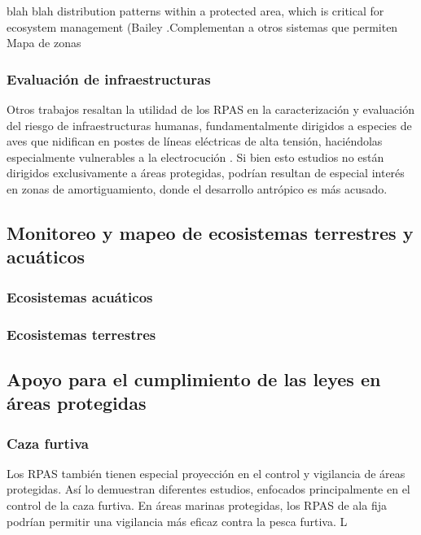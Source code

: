 \documentclass[11pt,]{article}
\begin{document}
\citep{PazmanyMulero2015} blah blah distribution patterns within a
protected area, which is critical for ecosystem management (Bailey
.Complementan a otros sistemas que permiten Mapa de zonas

\subsubsection{Evaluación de
infraestructuras}\label{evaluacion-de-infraestructuras}

Otros trabajos resaltan la utilidad de los RPAS en la caracterización y
evaluación del riesgo de infraestructuras humanas, fundamentalmente
dirigidos a especies de aves que nidifican en postes de líneas
eléctricas de alta tensión, haciéndolas especialmente vulnerables a la
electrocución \citep{Mulero-Pazmany2014a}. Si bien esto estudios no
están dirigidos exclusivamente a áreas protegidas, podrían resultan de
especial interés en zonas de amortiguamiento, donde el desarrollo
antrópico es más acusado.

\subsection{Monitoreo y mapeo de ecosistemas terrestres y
acuáticos}\label{monitoreo-y-mapeo-de-ecosistemas-terrestres-y-acuaticos}

\subsubsection{Ecosistemas acuáticos}\label{ecosistemas-acuaticos}

\subsubsection{Ecosistemas terrestres}\label{ecosistemas-terrestres}

\subsection{Apoyo para el cumplimiento de las leyes en áreas
protegidas}\label{apoyo-para-el-cumplimiento-de-las-leyes-en-areas-protegidas}

\subsubsection{Caza furtiva}\label{caza-furtiva}

Los RPAS también tienen especial proyección en el control y vigilancia
de áreas protegidas. Así lo demuestran diferentes estudios, enfocados
principalmente en el control de la caza furtiva. En áreas marinas
protegidas, los RPAS de ala fija podrían permitir una vigilancia más
eficaz contra la pesca furtiva. L
\end{document}
